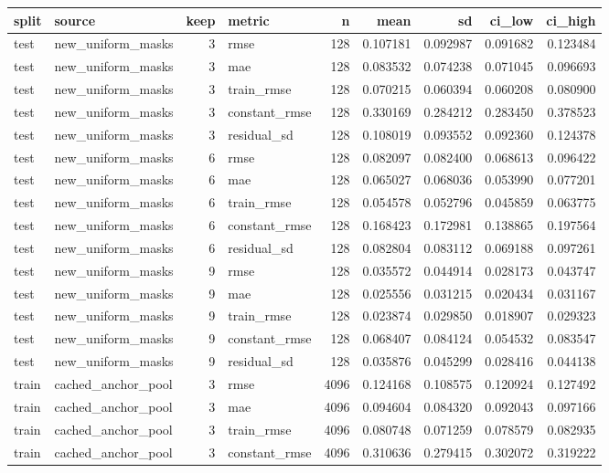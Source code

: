 \begin{tabular}{llrlrrrrr}
\toprule
split & source & keep & metric & n & mean & sd & ci_low & ci_high \\
\midrule
test & new_uniform_masks & 3 & rmse & 128 & 0.107181 & 0.092987 & 0.091682 & 0.123484 \\
test & new_uniform_masks & 3 & mae & 128 & 0.083532 & 0.074238 & 0.071045 & 0.096693 \\
test & new_uniform_masks & 3 & train_rmse & 128 & 0.070215 & 0.060394 & 0.060208 & 0.080900 \\
test & new_uniform_masks & 3 & constant_rmse & 128 & 0.330169 & 0.284212 & 0.283450 & 0.378523 \\
test & new_uniform_masks & 3 & residual_sd & 128 & 0.108019 & 0.093552 & 0.092360 & 0.124378 \\
test & new_uniform_masks & 6 & rmse & 128 & 0.082097 & 0.082400 & 0.068613 & 0.096422 \\
test & new_uniform_masks & 6 & mae & 128 & 0.065027 & 0.068036 & 0.053990 & 0.077201 \\
test & new_uniform_masks & 6 & train_rmse & 128 & 0.054578 & 0.052796 & 0.045859 & 0.063775 \\
test & new_uniform_masks & 6 & constant_rmse & 128 & 0.168423 & 0.172981 & 0.138865 & 0.197564 \\
test & new_uniform_masks & 6 & residual_sd & 128 & 0.082804 & 0.083112 & 0.069188 & 0.097261 \\
test & new_uniform_masks & 9 & rmse & 128 & 0.035572 & 0.044914 & 0.028173 & 0.043747 \\
test & new_uniform_masks & 9 & mae & 128 & 0.025556 & 0.031215 & 0.020434 & 0.031167 \\
test & new_uniform_masks & 9 & train_rmse & 128 & 0.023874 & 0.029850 & 0.018907 & 0.029323 \\
test & new_uniform_masks & 9 & constant_rmse & 128 & 0.068407 & 0.084124 & 0.054532 & 0.083547 \\
test & new_uniform_masks & 9 & residual_sd & 128 & 0.035876 & 0.045299 & 0.028416 & 0.044138 \\
train & cached_anchor_pool & 3 & rmse & 4096 & 0.124168 & 0.108575 & 0.120924 & 0.127492 \\
train & cached_anchor_pool & 3 & mae & 4096 & 0.094604 & 0.084320 & 0.092043 & 0.097166 \\
train & cached_anchor_pool & 3 & train_rmse & 4096 & 0.080748 & 0.071259 & 0.078579 & 0.082935 \\
train & cached_anchor_pool & 3 & constant_rmse & 4096 & 0.310636 & 0.279415 & 0.302072 & 0.319222 \\

\end{tabular}
